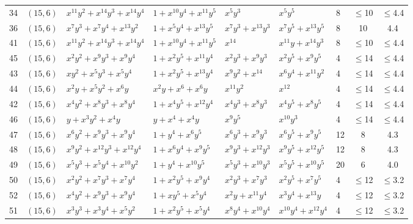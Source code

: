 \begin{table}[t]
\begin{tabular*}{\textwidth}{@{\extracolsep{\fill}}cllllllcc}
34 & $(15,6)$ & $x^{11}y^{2}{+}x^{14}y^{3}{+}x^{14}y^{4}$ & $1{+}x^{10}y^{4}{+}x^{11}y^{5}$ & $x^{5}y^{3}$ & $x^{5}y^{5}$ & 8 & $\leq$10 & $\leq$4.4 \\
36 & $(15,6)$ & $x^{7}y^{3}{+}x^{7}y^{4}{+}x^{13}y^{2}$ & $1{+}x^{5}y^{4}{+}x^{13}y^{5}$ & $x^{7}y^{3}{+}x^{13}y^{3}$ & $x^{7}y^{5}{+}x^{13}y^{5}$ & 8 & 10 & 4.4 \\
41 & $(15,6)$ & $x^{11}y^{2}{+}x^{14}y^{3}{+}x^{14}y^{4}$ & $1{+}x^{10}y^{4}{+}x^{11}y^{5}$ & $x^{14}$ & $x^{11}y{+}x^{14}y^{3}$ & 8 & $\leq$10 & $\leq$4.4 \\
45 & $(15,6)$ & $x^{2}y^{2}{+}x^{9}y^{3}{+}x^{9}y^{4}$ & $1{+}x^{2}y^{5}{+}x^{11}y^{4}$ & $x^{2}y^{3}{+}x^{9}y^{3}$ & $x^{2}y^{5}{+}x^{9}y^{5}$ & 4 & $\leq$14 & $\leq$4.4 \\
43 & $(15,6)$ & $xy^{2}{+}x^{5}y^{3}{+}x^{5}y^{4}$ & $1{+}x^{2}y^{5}{+}x^{13}y^{4}$ & $x^{9}y^{2}{+}x^{14}$ & $x^{6}y^{4}{+}x^{11}y^{2}$ & 4 & $\leq$14 & $\leq$4.4 \\
44 & $(15,6)$ & $x^{2}y{+}x^{5}y^{2}{+}x^{6}y$ & $x^{2}y{+}x^{6}{+}x^{6}y$ & $x^{11}y^{2}$ & $x^{12}$ & 4 & $\leq$14 & $\leq$4.4 \\
42 & $(15,6)$ & $x^{4}y^{2}{+}x^{8}y^{3}{+}x^{8}y^{4}$ & $1{+}x^{4}y^{5}{+}x^{12}y^{4}$ & $x^{4}y^{3}{+}x^{8}y^{3}$ & $x^{4}y^{5}{+}x^{8}y^{5}$ & 4 & $\leq$14 & $\leq$4.4 \\
46 & $(15,6)$ & $y{+}x^{3}y^{2}{+}x^{4}y$ & $y{+}x^{4}{+}x^{4}y$ & $x^{9}y^{5}$ & $x^{10}y^{3}$ & 4 & $\leq$14 & $\leq$4.4 \\
47 & $(15,6)$ & $x^{6}y^{2}{+}x^{9}y^{3}{+}x^{9}y^{4}$ & $1{+}y^{4}{+}x^{6}y^{5}$ & $x^{6}y^{3}{+}x^{9}y^{3}$ & $x^{6}y^{5}{+}x^{9}y^{5}$ & 12 & 8 & 4.3 \\
48 & $(15,6)$ & $x^{9}y^{2}{+}x^{12}y^{3}{+}x^{12}y^{4}$ & $1{+}x^{6}y^{4}{+}x^{9}y^{5}$ & $x^{9}y^{3}{+}x^{12}y^{3}$ & $x^{9}y^{5}{+}x^{12}y^{5}$ & 12 & 8 & 4.3 \\
49 & $(15,6)$ & $x^{5}y^{3}{+}x^{5}y^{4}{+}x^{10}y^{2}$ & $1{+}y^{4}{+}x^{10}y^{5}$ & $x^{5}y^{3}{+}x^{10}y^{3}$ & $x^{5}y^{5}{+}x^{10}y^{5}$ & 20 & 6 & 4.0 \\
50 & $(15,6)$ & $x^{2}y^{2}{+}x^{7}y^{3}{+}x^{7}y^{4}$ & $1{+}x^{2}y^{5}{+}x^{9}y^{4}$ & $x^{2}y^{3}{+}x^{7}y^{3}$ & $x^{2}y^{5}{+}x^{7}y^{5}$ & 4 & $\leq$12 & $\leq$3.2 \\
52 & $(15,6)$ & $x^{4}y^{2}{+}x^{9}y^{3}{+}x^{9}y^{4}$ & $1{+}xy^{5}{+}x^{5}y^{4}$ & $x^{2}y{+}x^{11}y^{4}$ & $x^{3}y^{4}{+}x^{13}y$ & 4 & $\leq$12 & $\leq$3.2 \\
51 & $(15,6)$ & $x^{3}y^{3}{+}x^{3}y^{4}{+}x^{5}y^{2}$ & $1{+}x^{2}y^{5}{+}x^{5}y^{4}$ & $x^{8}y^{4}{+}x^{10}y^{4}$ & $x^{10}y^{4}{+}x^{12}y^{4}$ & 4 & $\leq$12 & $\leq$3.2 \\

\end{tabular*}
\end{table}
